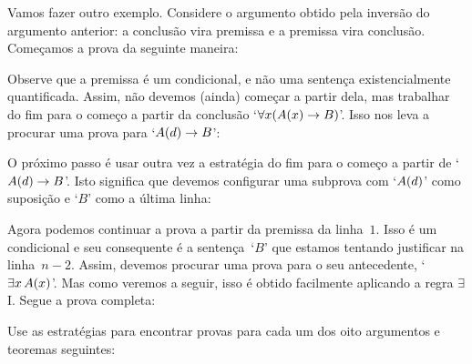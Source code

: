 Vamos fazer outro exemplo. Considere o argumento obtido pela inversão do argumento anterior: a conclusão vira premissa e a premissa vira conclusão. Começamos a prova da seguinte maneira:
\begin{fitchproof}
	\ellipsesline
\end{fitchproof}
Observe que a premissa é um condicional, e não uma sentença  existencialmente quantificada. Assim, não devemos (ainda) começar a partir  dela,  mas trabalhar do fim para o começo a partir da conclusão `$\forall x(\mathord{A}(x) \rightarrow B)$'. Isso nos leva a procurar uma prova para `$\mathord{A}(d) \rightarrow B$':
\begin{fitchproof}
	\ellipsesline
\end{fitchproof}
O próximo passo é usar outra vez a estratégia do fim para o começo a partir de  `$\mathord{A}(d) \rightarrow B$'.  Isto significa que devemos configurar uma subprova  com  `$\mathord{A}(d)$' como suposição  e `$B$' como a última linha:  
 
\begin{fitchproof}
	\open
	\ellipsesline
	\close
\end{fitchproof}
Agora podemos continuar a prova a partir da premissa da linha~$1$. Isso é um condicional e seu consequente é a sentença~`$B$' que estamos tentando justificar na linha~$n-2$. Assim, devemos procurar uma prova para o seu antecedente, `$\exists x\,\mathord{A}(x)$'. Mas  como veremos a seguir, isso é obtido  facilmente aplicando a regra  $\exists$I.   Segue a prova completa:\begin{fitchproof}
	\open
	\close
\end{fitchproof}

\practiceproblems

\problempart
Use as estratégias  para encontrar provas para cada um dos oito argumentos e teoremas seguintes:
 
